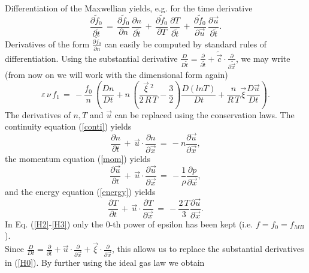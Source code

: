 Differentiation of the Maxwellian yields, e.g. for the time derivative
\begin{equation}
  \frac{\partial{\tilde{f}_0}}{\partial{\tilde{t}}} \,=\, \frac{\partial{\tilde{f}_0}}{\partial{n}} \, \frac{\partial{n}}{\partial{\tilde{t}}} \,+\, \frac{\partial{\tilde{f}_0}}{\partial{T}} \, \frac{\partial{T}}{\partial{\tilde{t}}}  \,+\, \frac{\partial{\tilde{f}_0}}{\partial{\vec u}} \, \frac{\partial{\vec u}}{\partial{\tilde{t}}} .\nonumber
\end{equation}
Derivatives of the form $\frac{\partial{\tilde{f}_0}}{\partial{n}}$ can easily be computed by standard rules of differentiation. Using the substantial derivative $\frac{D}{D\tilde{t}} = \frac{\partial{}}{\partial{\tilde{t}}} +  \tilde{\vec c} \cdot  \frac{\partial{ }}{\partial{\tilde{\vec x}}}$, we may write (from now on we will work with the dimensional form again)
\begin{equation}
 \varepsilon \, \nu\, f_1 \,=\, - \frac{f_0}{ n} \, \left( \frac{Dn}{Dt} + n \, \left(\frac{\vec \xi\,^2}{2\,R\,T} - \frac{3}{2}\right) \frac{D(lnT)}{Dt} + \frac{n}{R\,T} \vec \xi \frac{D\vec u}{Dt} \right) .\label{H0}
\end{equation}%
The derivatives of $n,T$ and $\vec u$ can be replaced using the conservation laws. The continuity equation (\ref{conti}) yields
\begin{equation}
  \frac{\partial{n}}{\partial{t}}  \, + \, \vec u \cdot \frac{\partial{n}}{\partial{\vec x}}   \, =\, - n \frac{\partial{\vec u}}{\partial{\vec x}},\label{H1}
\end{equation}
the momentum equation (\ref{mom}) yields
\begin{equation}
  \frac{\partial{\vec u}}{\partial{t}}  \, + \, \vec u \cdot \frac{\partial{\vec u}}{\partial{\vec x}}   \, =\, - \frac{1}{\rho}  \frac{\partial{p}}{\partial{\vec x}},\label{H2}
\end{equation}
and the energy equation (\ref{energy}) yields
\begin{equation}
  \frac{\partial{T}}{\partial{t}}  \, + \, \vec u \cdot \frac{\partial{T}}{\partial{\vec x}}   \, =\, - \frac{2 \, T}{3}  \frac{\partial{\vec u}}{\partial{\vec x}}.\label{H3}
\end{equation}
In Eq. (\ref{H2}-\ref{H3}) only the $0$-th power of epsilon has been kept (i.e. $f=f_0=f_{MB}$).\\[1ex]
Since $\frac{D}{Dt} = \frac{\partial{}}{\partial{t}} +  \vec u \cdot  \frac{\partial{ }}{\partial{\vec x}}+ \vec \xi \cdot  \frac{\partial{ }}{\partial{\vec x}}$, this allows us to replace the substantial derivatives in (\ref{H0}). By further using the ideal gas law we obtain
